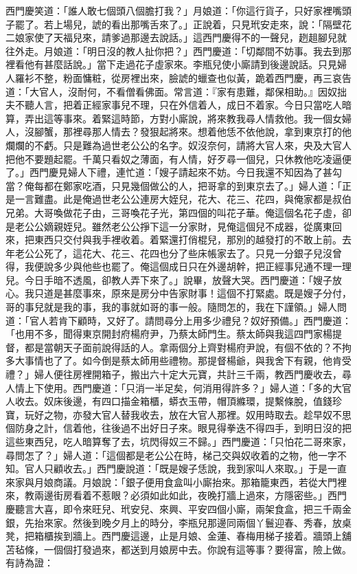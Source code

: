 西門慶笑道：「誰人敢七個頭八個膽打我？」月娘道：「你這行貨子，只好家裡嘴頭子罷了。若上場兒，諕的看出那嘴舌來了。」正說着，只見玳安走來，說：「隔壁花二娘家使了天福兒來，請爹過那邊去說話。」這西門慶得不的一聲兒，趔趄腳兒就往外走。月娘道：「明日沒的教人扯你把？」西門慶道：「切鄰間不妨事。我去到那裡看他有甚麼話說。」當下走過花子虛家來。李瓶兒使小廝請到後邊說話。只見婦人羅衫不整，粉面慵粧，從房裡出來，臉諕的蠟查也似黃，跪着西門慶，再三哀告道：「大官人，沒耐何，不看僧看佛面。常言道：『家有患難，鄰保相助。』因奴拙夫不聽人言，把着正經家事兒不理，只在外信着人，成日不着家。今日只當吃人暗算，弄出這等事來。着緊這時節，方對小廝說，將來教我尋人情救他。我一個女婦人，沒腳蟹，那裡尋那人情去？發狠起將來。想着他恁不依他說，拿到東京打的他爛爛的不虧。只是難為過世老公公的名字。奴沒奈何，請將大官人來，央及大官人把他不要題起罷。千萬只看奴之薄面，有人情，好歹尋一個兒，只休教他吃凌逼便了。」西門慶見婦人下禮，連忙道：「嫂子請起來不妨。今日我還不知因為了甚勾當？俺每都在鄭家吃酒，只見幾個做公的人，把哥拿的到東京去了。」婦人道：「正是一言難盡。此是俺過世老公公連房大姪兒，花大、花三、花四，與俺家都是叔伯兄弟。大哥喚做花子由，三哥喚花子光，第四個的叫花子華。俺這個名花子虛，卻是老公公嫡親姪兒。雖然老公公掙下這一分家財，見俺這個兒不成器，從廣東回來，把東西只交付與我手裡收着。着緊還打俏棍兒，那別的越發打的不敢上前。去年老公公死了，這花大、花三、花四也分了些床帳家去了。只見一分銀子兒沒曾得，我便說多少與他些也罷了。俺這個成日只在外邊胡幹，把正經事兒通不理一理兒。今日手暗不透風，卻教人弄下來了。」說畢，放聲大哭。西門慶道：「嫂子放心。我只道是甚麼事來，原來是房分中告家財事！這個不打緊處。既是嫂子分付，哥的事兒就是我的事，我的事就如哥的事一般。隨問怎的，我在下謹領。」婦人問道：「官人若肯下顧時，又好了。請問尋分上用多少禮兒？奴好預備。」西門慶道：「也用不多，聞得東京開封府楊府尹，乃蔡太師門生。蔡太師與我這四門家楊提督，都是當朝天子面前說得話的人。拿兩個分上齊對楊府尹說，有個不依的？不拘多大事情也了了。如今倒是蔡太師用些禮物。那提督楊爺，與我舍下有親，他肯受禮？」婦人便往房裡開箱子，搬出六十定大元寶，共計三千兩，教西門慶收去，尋人情上下使用。西門慶道：「只消一半足矣，何消用得許多？」婦人道：「多的大官人收去。奴床後邊，有四口描金箱櫃，蟒衣玉帶，帽頂縧環，提繫條脫，值錢珍寶，玩好之物，亦發大官人替我收去，放在大官人那裡。奴用時取去。趁早奴不思個防身之計，信着他，往後過不出好日子來。眼見得拳迭不得四手，到明日沒的把這些東西兒，吃人暗算奪了去，坑閃得奴三不歸。」西門慶道：「只怕花二哥來家，尋問怎了？」婦人道：「這個都是老公公在時，梯己交與奴收着的之物，他一字不知。官人只顧收去。」西門慶說道：「既是嫂子恁說，我到家叫人來取。」于是一直來家與月娘商議。月娘說：「銀子便用食盒叫小廝抬來。那箱籠東西，若從大門裡來，教兩邊街房看着不惹眼？必須如此如此，夜晚打牆上過來，方隱密些。」西門慶聽言大喜，即令來旺兒、玳安兒、來興、平安四個小廝，兩架食盒，把三千兩金銀，先抬來家。然後到晚夕月上的時分，李瓶兒那邊同兩個丫鬟迎春、秀春，放桌凳，把箱櫃挨到牆上。西門慶這邊，止是月娘、金蓮、春梅用梯子接着。牆頭上舖苫毡條，一個個打發過來，都送到月娘房中去。你說有這等事？要得富，險上做。有詩為證：

